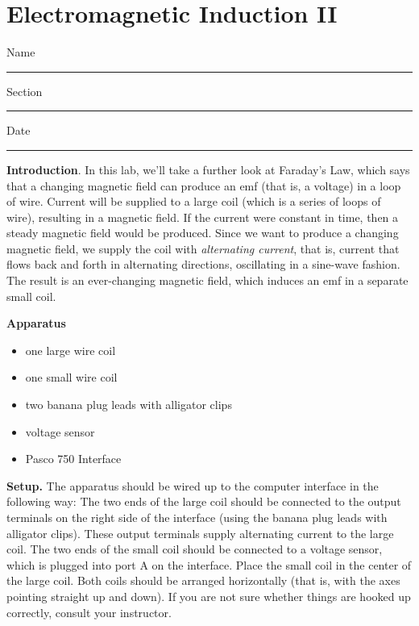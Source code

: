
\section{Electromagnetic Induction II}

Name \rule{2.0in}{0.1pt}\hfill{}Section \rule{1.0in}{0.1pt}\hfill{}Date
\rule{1.0in}{0.1pt}

\bigskip
\bigskip
\bigskip


\textbf{Introduction}.
In this lab, we'll take a further look at Faraday's Law, which says
that a changing magnetic field can produce an emf (that is, a voltage)
in a loop of wire.  Current will be supplied to a large coil (which is a 
series of loops of wire), resulting in a magnetic field.  
If the current were constant in time,
then a steady magnetic field would be produced.  Since we want to
produce a changing magnetic field, we supply the coil with {\it
alternating current}, that is, current that flows back and forth in
alternating directions, oscillating in a sine-wave fashion.  The
result is an ever-changing magnetic field, which induces an emf in
a separate small coil.

\textbf{Apparatus}

\begin{itemize}

\item one large wire coil

\item one small wire coil

\item two banana plug leads with alligator clips

\item voltage sensor

\item Pasco 750 Interface

\end{itemize}

{\bf Setup.} The apparatus should be wired up to the computer interface in the 
following way: The two ends of the large coil should be connected to the output
terminals on the right side of the interface (using the banana plug leads with 
alligator clips). These output terminals supply alternating current to the 
large coil. The two ends of the small coil should be connected to a voltage 
sensor, which is plugged into port A on the interface. Place the small coil in 
the center of the large coil. Both coils should be arranged horizontally (that 
is, with the axes pointing straight up and down). If you are not sure whether 
things are hooked up correctly, consult your instructor.

